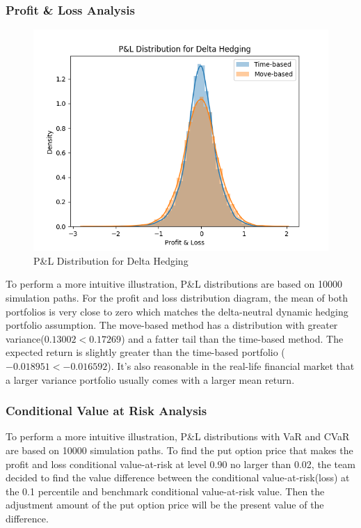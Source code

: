 \documentclass[12pt]{article}
\begin{document}
\subsubsection{Profit \& Loss Analysis}
\begin{figure}[H]
  \centering
  \includegraphics[scale=0.8]{PnLDistributionforDeltaHedging.png}
  \caption{P\&L Distribution for Delta Hedging}
\end{figure}

To perform a more intuitive illustration, P\&L distributions are based on 10000 simulation paths. 
For the profit and loss distribution diagram, the mean of both portfolios is very close to zero which matches the delta-neutral dynamic hedging portfolio assumption. The move-based method has a distribution with greater variance($0.13002<0.17269$) and a fatter tail than the time-based method. 
The expected return is slightly greater than the time-based portfolio ($-0.018951 < -0.016592$). It’s also reasonable in the real-life financial market that a larger variance portfolio usually comes with a larger mean return.

\subsubsection{Conditional Value at Risk Analysis}
To perform a more intuitive illustration, P\&L distributions with VaR and CVaR are based on 10000 simulation paths. 
To find the put option price that makes the profit and loss conditional value-at-risk at level 0.90 no larger than 0.02, the team decided to find the value difference between the conditional value-at-risk(loss) at the 0.1 percentile and benchmark conditional value-at-risk value. 
Then the adjustment amount of the put option price will be the present value of the difference.
\end{document}
